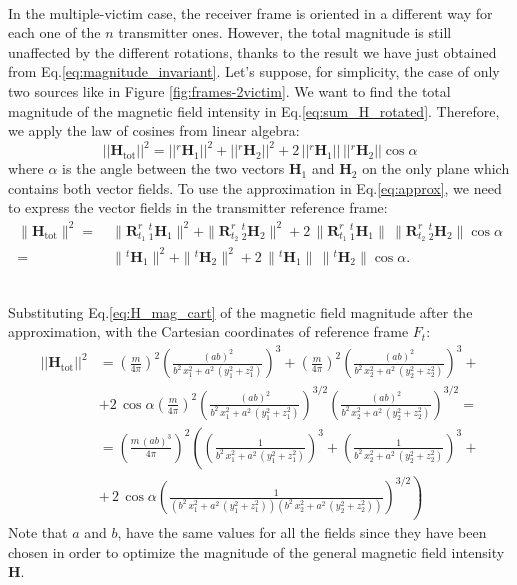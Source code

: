 \documentclass[main]{subfiles}
\begin{document}
\noindent\\
In the multiple-victim case, the receiver frame is oriented in a different way
for each one of the $n$ transmitter ones. However, the total magnitude is still unaffected by the 
different rotations, thanks to the result we have just obtained from Eq.\ref{eq:magnitude_invariant}.
Let's suppose, for simplicity, the case of only two sources like in Figure \ref{fig:frames-2victim}.
We want to find the total magnitude of the magnetic field intensity in Eq.\ref{eq:sum_H_rotated}.
Therefore, we apply the law of cosines from linear algebra:
\[
|| \mathbf{H}_{\text{tot}}||^2 = ||{}^r \mathbf{H}_1||^2 + ||{}^r \mathbf{H}_2||^2 + 2 \, ||{}^r\mathbf{H}_1|| \, ||{}^r\mathbf{H}_2|| \cos \alpha
\]
where \( \alpha \) is the angle between the two vectors \( \mathbf{H}_1 \) and \( \mathbf{H}_2 \) on the only plane which contains both vector fields.
To use the approximation in Eq.\ref{eq:approx}, we need to express the vector fields
in the transmitter reference frame:
\begin{align*}
\|\mathbf{H}_{\text{tot}}\|^2 = 
&\ \|\mathbf{R}^r_{t_1} \, {}^t_1 \mathbf{H}_1\|^2 + \|\mathbf{R}^r_{t_2} \, {}^t_2 \mathbf{H}_2\|^2  + 2 \, \|\mathbf{R}^r_{t_1} \, {}^t_1 \mathbf{H}_1\| \, \|\mathbf{R}^r_{t_2} \, {}^t_2 \mathbf{H}_2\| \cos \alpha \\
= &\ \|{}^t \mathbf{H}_1\|^2 + \|{}^t \mathbf{H}_2\|^2 + 2 \, \|{}^t \mathbf{H}_1\| \, \|{}^t \mathbf{H}_2\| \cos \alpha.
\end{align*}

\noindent\\
Substituting Eq.\ref{eq:H_mag_cart} of the magnetic field magnitude after the approximation, 
with the Cartesian coordinates of reference frame $F_t$:
\[
\begin{aligned}
|| \mathbf{H}_{\text{tot}}||^2 &= \left( \frac{m}{4 \pi} \right)^2 \left( \frac{(ab)^2}{b^2 \, x_1^2 + a^2 \, (y_1^2 + z_1^2)} \right)^3 
+ \left( \frac{m}{4 \pi} \right)^2 \left( \frac{(ab)^2}{b^2 \, x_2^2 + a^2 \, (y_2^2 + z_2^2)} \right)^3 + \\
& + 2 \, \cos \alpha \left( \frac{m}{4 \pi} \right)^2 \left( \frac{(ab)^2}{b^2 \, x_1^2 + a^2 \, (y_1^2 + z_1^2)} \right)^{3/2} \left( \frac{(ab)^2}{b^2 \, x_2^2 + a^2 \, (y_2^2 + z_2^2)} \right)^{3/2} = \\
&= \left( \frac{m \, (ab)^3}{4 \pi} \right)^2 \left( \left( \frac{1}{b^2 \, x_1^2 + a^2 \, (y_1^2 + z_1^2)} \right)^3 
+  \left( \frac{1}{b^2 \, x_2^2 + a^2 \, (y_2^2 + z_2^2)} \right)^3 \right. + \\
& \left. + \, 2 \, \cos \alpha \left( \frac{1}{(b^2 \, x_1^2 + a^2 \, (y_1^2 + z_1^2))(b^2 \, x_2^2 + a^2 \, (y_2^2 + z_2^2))} \right)^{3/2} \right)
\end{aligned}
\]
Note that $a$ and $b$, have the same values for all the fields since they have been chosen in order to optimize the magnitude of the 
general magnetic field intensity $\mathbf{H}$.
\end{document}
